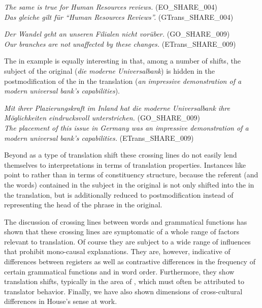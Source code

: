 \documentclass[output=paper]{LSP/langsci}
\begin{document}
\newpage 
\ea \label{ex:culo:33}
    \ea \textit{The same is true for Human Resources reviews.} (EO\_SHARE\_004)\\
    \ex \textit{Das gleiche gilt für ``Human Resources Reviews''.} (GTrans\_SHARE\_004) 
    \z
\z


\ea \label{ex:culo:34}
    \ea \textit{Der Wandel geht an unseren Filialen nicht vorüber.} (GO\_SHARE\_009)\\
    \ex \textit{Our branches are not unaffected by these changes.} (ETrans\_SHARE\_009) 
    \z
\z
 
The  in example  is equally interesting in that, among a number of shifts, the subject of the original (\textit{die moderne Universalbank}) is hidden in the postmodification of the  in the translation (\textit{an impressive demonstration of a modern universal bank's capabilities}). 

\ea \label{ex:culo:35}
     \ea \textit{Mit ihrer Plazierungskraft im Inland hat die moderne Universalbank ihre Möglichkeiten eindrucksvoll unterstrichen.} (GO\_SHARE\_009)\\
     \ex \textit{The placement of this issue in Germany was an impressive demonstration of a modern   universal bank's capabilities.} (ETrans\_SHARE\_009)
     \z
\z

Beyond  as a type of translation shift these crossing lines do not easily lend themselves to interpretations in terms of translation properties. Instances like  point to  rather than  in terms of constituency structure, because the referent (and the words) contained in the subject in the original is not only shifted into the  in the translation, but is additionally reduced to postmodification instead of representing the head of the phrase in the original.

The discussion of crossing lines between words and grammatical functions has shown that these crossing lines are symptomatic of a whole range of factors relevant to translation. Of course they are subject to a wide range of influences that prohibit mono-causal explanations. They are, however, indicative of differences between registers as well as contrastive differences in the frequency of certain grammatical functions and in word order. Furthermore, they show translation shifts, typically in the area of , which must often be attributed to translator behavior. Finally, we have also shown dimensions of cross-cultural differences in House's sense at work.
\end{document}
